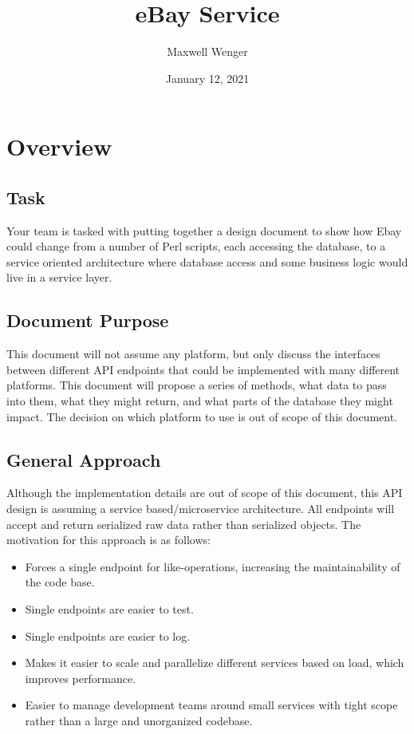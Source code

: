 \documentclass{article}
\title{eBay Service}
\author{Maxwell Wenger}
\date{January 12, 2021}
\begin{document}
\maketitle
\tableofcontents

\section{Overview}

\subsection{Task}
Your team is tasked with putting together a design document to show how Ebay
could change from a number of Perl scripts, each accessing the database, to a
service oriented architecture where database access and some business logic
would live in a service layer.

\subsection{Document Purpose}
This document will not assume any platform, but only discuss the interfaces
between different API endpoints that could be implemented with many different
platforms. This document will propose a series of methods, what data to pass
into them, what they might return, and what parts of the database they might
impact. The decision on which platform to use is out of scope of this document.

\subsection{General Approach}
Although the implementation details are out of scope of this document, this API
design is assuming a service based/microservice architecture. All endpoints
will accept and return serialized raw data rather than serialized objects. The
motivation for this approach is as follows:

\begin{itemize}
    \item Forces a single endpoint for like-operations, increasing the
        maintainability of the code base.
    \item Single endpoints are easier to test.
    \item Single endpoints are easier to log.
    \item Makes it easier to scale and parallelize different services based on
        load, which improves performance.
    \item Easier to manage development teams around small services with tight
        scope rather than a large and unorganized codebase.
\end{itemize}
\end{document}

